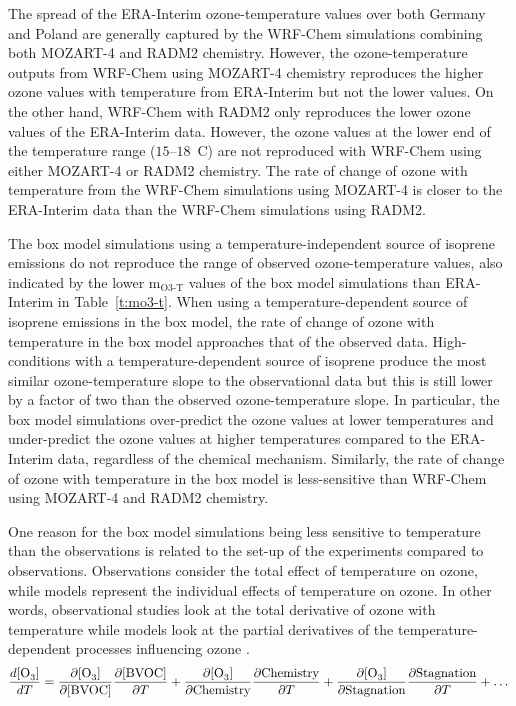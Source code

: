 The spread of the ERA-Interim ozone-temperature values over both Germany and Poland are generally captured by the WRF-Chem simulations combining both MOZART-4 and RADM2 chemistry. 
However, the ozone-temperature outputs from WRF-Chem using MOZART-4 chemistry reproduces the higher ozone values with temperature from ERA-Interim but not the lower values.
On the other hand, WRF-Chem with RADM2 only reproduces the lower ozone values of the ERA-Interim data.
However, the ozone values at the lower end of the temperature range ($15$--$18$~\degree C) are not reproduced with WRF-Chem using either MOZART-4 or RADM2 chemistry.
The rate of change of ozone with temperature from the WRF-Chem simulations using MOZART-4 is closer to the ERA-Interim data than the WRF-Chem simulations using RADM2.

The box model simulations using a temperature-independent source of isoprene emissions do not reproduce the range of observed ozone-temperature values, also indicated by the lower m$_{\text{O3-T}}$ values of the box model simulations than ERA-Interim in Table~\ref{t:mo3-t}.
When using a temperature-dependent source of isoprene emissions in the box model, the rate of change of ozone with temperature in the box model approaches that of the observed data.
High- conditions with a temperature-dependent source of isoprene produce the most similar ozone-temperature slope to the observational data but this is still lower by a factor of two than the observed ozone-temperature slope.
In particular, the box model simulations over-predict the ozone values at lower temperatures and under-predict the ozone values at higher temperatures compared to the ERA-Interim data, regardless of the chemical mechanism.
Similarly, the rate of change of ozone with temperature in the box model is less-sensitive than WRF-Chem using MOZART-4 and RADM2 chemistry.

One reason for the box model simulations being less sensitive to temperature than the observations is related to the set-up of the experiments compared to observations.
Observations consider the total effect of temperature on ozone, while models represent the individual effects of temperature on ozone. 
In other words, observational studies look at the total derivative of ozone with temperature while models look at the partial derivatives of the temperature-dependent processes influencing ozone \citep{Rasmussen:2013}. 
\begin{equation*} 
    \frac{d[\ce{O3}]}{dT} = \frac{\partial [\ce{O3}]}{\partial [\text{BVOC}]}\frac{\partial [\text{BVOC}]}{\partial T} + \frac{\partial [\ce{O3}]}{\partial \text{Chemistry}}\frac{\partial \text{Chemistry}}{\partial T} + \frac{\partial [\ce{O3}]}{\partial \text{Stagnation}}\frac{\partial \text{Stagnation}}{\partial T} + \dots
\end{equation*}

